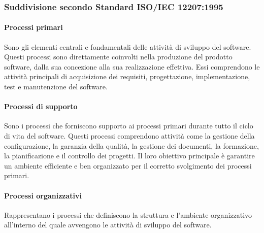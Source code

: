\subsubsection{Suddivisione secondo Standard ISO/IEC 12207:1995}

\paragraph{Processi primari}
Sono gli elementi centrali e fondamentali delle attività di sviluppo del software. Questi processi sono direttamente coinvolti nella produzione del prodotto software, dalla sua concezione alla sua realizzazione effettiva. Essi comprendono le attività principali di acquisizione dei requisiti, progettazione, implementazione, test e manutenzione del software.

\paragraph{Processi di supporto}
Sono i processi che forniscono supporto ai processi primari durante tutto il ciclo di vita del software. Questi processi comprendono attività come la gestione della configurazione, la garanzia della qualità, la gestione dei documenti, la formazione, la pianificazione e il controllo dei progetti. Il loro obiettivo principale è garantire un ambiente efficiente e ben organizzato per il corretto svolgimento dei processi primari.

\paragraph{Processi organizzativi}
Rappresentano i processi che definiscono la struttura e l'ambiente organizzativo all'interno del quale avvengono le attività di sviluppo del software. 
